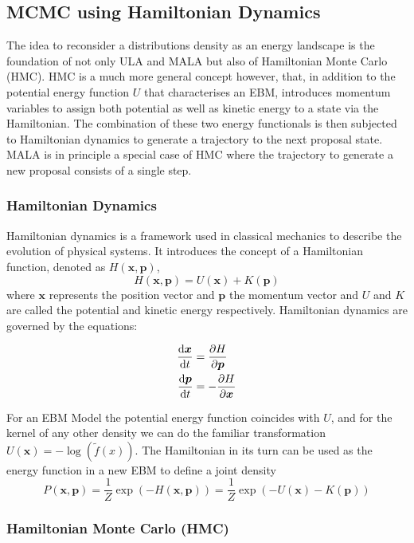 
\subsection{MCMC using Hamiltonian Dynamics}

The idea to reconsider a distributions density as an energy landscape is the foundation of not only ULA and MALA but also of Hamiltonian Monte Carlo (HMC).
HMC is a much more general concept however, that, in addition to the potential energy function $U$ that characterises an EBM, 
introduces momentum variables to assign both potential as well as kinetic energy to a state via the Hamiltonian.
The combination of these two energy functionals is then subjected to Hamiltonian dynamics to generate a trajectory to the next proposal state.
MALA is in principle a special case of HMC where the trajectory to generate a new proposal consists of a single step.

\subsubsection{ Hamiltonian Dynamics }
Hamiltonian dynamics is a framework used in classical mechanics to describe the evolution of physical systems. 
It introduces the concept of a Hamiltonian function, denoted as $H(\bm{x}, \bm{p})$,
\[
	H(\bm{x}, \bm{p}) = U(\bm{x}) + K(\bm{p})
\]
where $\bm{x}$ represents the position vector and $\bm{p}$ the momentum vector and $U$ and $K$ are called the potential and kinetic energy respectively.
Hamiltonian dynamics are governed by the equations:

\[
\begin{aligned}
	\frac{\mathop{}\!\mathrm{d} \bm{x}}{\mathop{}\!\mathrm{d} t} &= \frac{\partial H}{\partial \bm{p}} \\
	\frac{\mathop{}\!\mathrm{d} \bm{p}}{\mathop{}\!\mathrm{d} t} &= -\frac{\partial H}{\partial \bm{x}} \\
\end{aligned}
\]

For an EBM Model the potential energy function coincides with $U$, 
and for the kernel of any other density we can do the familiar transformation $U(\bm{x}) = - \log(\tilde{f}(x))$.
The Hamiltonian in its turn can be used as the energy function in a new EBM to define a joint density
\[
	P(\bm{x}, \bm{p}) = \frac{1}{Z} \exp( - H(\bm{x}, \bm{p}) ) = \frac{1}{Z} \exp( - U(\bm{x}) - K(\bm{p}) )
\]


\subsubsection{Hamiltonian Monte Carlo (HMC)}

